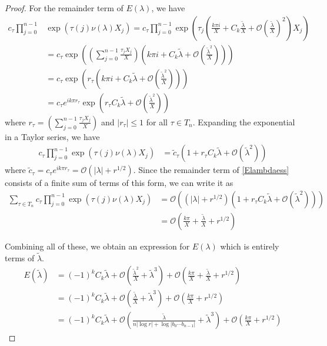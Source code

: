 \documentclass[thesis.tex]{subfiles}
\begin{document}
\begin{lemma}
\begin{proof}
For the remainder term of $E(\lambda)$, we have
\begin{align*}
c_\tau \prod_{j = 0}^{n-1} &\exp\left( {\tau(j) \nu(\lambda)X_j} \right)
= c_\tau \prod_{j = 0}^{n-1} 
\exp\left( \tau_j \left( \frac{k \pi i}{X} + C_k \frac{\tilde{\lambda}}{X} + \mathcal{O}\left( \frac{\tilde{\lambda}}{X}\right)^2 \right) X_j\right) \\
&= c_\tau \exp\left( \left( \sum_{j=0}^{n-1} \frac{\tau_j X_j}{X} \right)
\left( k \pi i + C_k \tilde{\lambda} + \mathcal{O}\left( \frac{\tilde{\lambda}^2}{X} \right) \right) \right) \\
&= c_\tau \exp\left( r_\tau
\left( k \pi i + C_k \tilde{\lambda} + \mathcal{O}\left( \frac{\tilde{\lambda}^2}{X} \right) \right) \right) \\ 
&= c_\tau e^{i k \pi r_\tau} \exp \left( r_\tau C_k \tilde{\lambda} + \mathcal{O}\left( \frac{\tilde{\lambda}^2}{X} \right) \right)
\end{align*}
where $r_\tau = \left( \sum_{j=0}^{n-1} \frac{\tau_j X_j}{X} \right)$ and $|r_\tau| \leq 1$ for all $\tau \in T_n$. Expanding the exponential in a Taylor series, we have
\begin{align*}
c_\tau \prod_{j = 0}^{n-1} \exp\left( {\tau(j) \nu(\lambda)X_j} \right)
&= \tilde{c}_\tau \left( 1 + r_\tau C_k \tilde{\lambda} + \mathcal{O}\left(\tilde{\lambda}^2 \right) \right) 
\end{align*}
where $\tilde{c}_\tau = c_\tau e^{i k \pi r_\tau} = \mathcal{O}(|\lambda| + r^{1/2})$. 
Since the remainder term of \eqref{Elambdaess} consists of a finite sum of terms of this form, we can write it as
\begin{align*}
\sum_{\tau \in T_n} c_\tau \prod_{j = 0}^{n-1} \exp\left( {\tau(j) \nu(\lambda)X_j} \right)
&= \mathcal{O}\left( (|\lambda| + r^{1/2}) \left( 1 + r_\tau C_k \tilde{\lambda} + \mathcal{O}\left(\tilde{\lambda}^2 \right) \right)\right) \\
&= \mathcal{O} \left( \frac{k \pi}{X} + \frac{\tilde{\lambda}}{X} + r^{1/2} \right)
\end{align*}

Combining all of these, we obtain an expression for $E(\lambda)$ which is entirely terms of $\tilde{\lambda}$.
\begin{align*}
E(\tilde{\lambda})
&= (-1)^k C_k \tilde{\lambda} + \mathcal{O}\left( \frac{\tilde{\lambda}^2}{X} + \tilde{\lambda}^3 \right) + \mathcal{O} \left( \frac{k \pi}{X} + \frac{\tilde{\lambda}}{X} + r^{1/2} \right) \\
&= (-1)^k C_k \tilde{\lambda} + \mathcal{O}\left( \frac{\tilde{\lambda}}{X} + \tilde{\lambda}^3 \right) + \mathcal{O} \left( \frac{k \pi}{X} + r^{1/2} \right) \\
&= (-1)^k C_k \tilde{\lambda} + \mathcal{O}\left( \frac{\tilde{\lambda}}{n|\log r| + \log|b_0\cdots b_{n-1}|} + \tilde{\lambda}^3 \right) + \mathcal{O} \left( \frac{k \pi}{X} + r^{1/2} \right)
\end{align*}


\end{proof}
\end{lemma}
\end{document}
